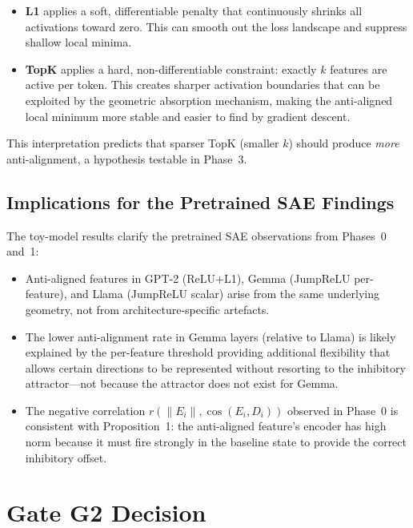 \documentclass[11pt,a4paper]{article}
\newcommand{\cosED}{\cos(E_i, D_i)}
\begin{document}
\begin{itemize}[noitemsep]
  \item \textbf{L1} applies a soft, differentiable penalty that continuously shrinks
        all activations toward zero.  This can smooth out the loss landscape and
        suppress shallow local minima.
  \item \textbf{TopK} applies a hard, non-differentiable constraint: exactly $k$
        features are active per token.  This creates sharper activation boundaries that
        can be exploited by the geometric absorption mechanism, making the
        anti-aligned local minimum more stable and easier to find by gradient descent.
\end{itemize}

This interpretation predicts that sparser TopK (smaller $k$) should produce \emph{more}
anti-alignment, a hypothesis testable in Phase~3.

\subsection{Implications for the Pretrained SAE Findings}

The toy-model results clarify the pretrained SAE observations from Phases~0 and~1:
\begin{itemize}[noitemsep]
  \item Anti-aligned features in GPT-2 (ReLU+L1), Gemma (JumpReLU per-feature), and
        Llama (JumpReLU scalar) arise from the same underlying geometry, not from
        architecture-specific artefacts.
  \item The lower anti-alignment rate in Gemma layers (relative to Llama) is likely
        explained by the per-feature threshold providing additional flexibility that
        allows certain directions to be represented without resorting to the inhibitory
        attractor---not because the attractor does not exist for Gemma.
  \item The negative correlation $r(\|E_i\|, \cosED)$ observed in Phase~0 is consistent
        with Proposition~1: the anti-aligned feature's encoder has high norm because it
        must fire strongly in the baseline state to provide the correct inhibitory offset.
\end{itemize}

\section{Gate G2 Decision}
\label{sec:gate}
\end{document}
